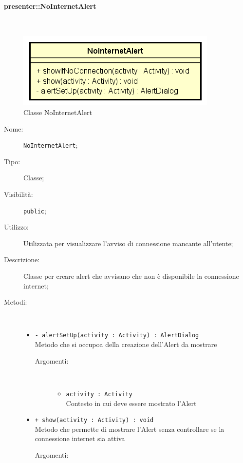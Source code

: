 \documentclass[../DefinizioneDiProdotto.tex]{subfiles}
\begin{document}
\paragraph{presenter::NoInternetAlert}
\
\begin{figure}[H]
	\centering
	\includegraphics[width=\maxwidth]{img/NoInternetAlert.png}
	\caption{Classe NoInternetAlert}\label{fig:presenter::NoInternetAlert} 
\end{figure}
\begin{description}
	\item[Nome:] \texttt{NoInternetAlert};
	\item[Tipo:] Classe;
	\item[Visibilità:] \texttt{public};
	\item[Utilizzo:] Utilizzata per visualizzare l'avviso di connessione mancante all'utente;
	\item[Descrizione:] Classe per creare alert che avvisano che non è disponibile la connessione internet;
	\item[Metodi:] \
	\begin{itemize}
		\item \texttt{- alertSetUp(activity : Activity) : AlertDialog}\\
		Metodo che si occupoa della creazione dell'Alert da mostrare
		\begin{description}
			\item[Argomenti:] \
			\begin{itemize}
				\item \texttt{activity : Activity}\\
				Contesto in cui deve essere mostrato l'Alert\end{itemize}
		\end{description}
		\item \texttt{+ show(activity : Activity) : void}\\
		Metodo che permette di mostrare l'Alert senza controllare se la connessione internet sia attiva
		\begin{description}
			\item[Argomenti:] \
			\begin{itemize}

\end{itemize}
\end{description}
\end{itemize}
\end{description}
\end{document}
